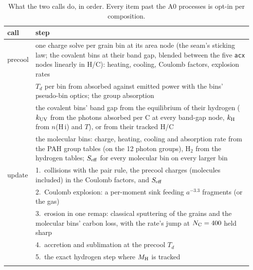\documentclass[11pt,a4paper]{article}
\newcommand{\NC}{N_{\rm C}}
\newcommand{\MH}{M_{\rm H}}
\begin{document}
\begin{table}[H]
\centering\small
\caption{What the two calls do, in order. Every item past the A0 processes is opt-in per composition.}\label{tab:a3c}
\begin{tabularx}{\textwidth}{@{}l L@{}}
\toprule
call & step \\
\midrule
precool & one charge solve per grain bin at its area node (the seam's sticking law; the covalent bins at their band gap,
  blended between the five \texttt{acx} nodes linearly in H/C): heating, cooling, Coulomb factors, explosion rates \\
\addlinespace[3pt]
& $T_d$ per bin from absorbed against emitted power with the bins' pseudo-bin optics; the group absorption \\
\addlinespace[3pt]
& the covalent bins' band gap from the equilibrium of their hydrogen ($k_{\rm UV}$ from the photons absorbed per C at
  every band-gap node, $k_{\rm H}$ from $n$(H\,{\sc i}) and $T$), or from their tracked H/C \\
\addlinespace[3pt]
& the molecular bins: charge, heating, cooling and absorption rate from the PAH group tables (on the 12 photon groups),
  H$_2$ from the hydrogen tables; $S_{\rm eff}$ for every molecular bin on every larger bin \\
\addlinespace[3pt]
\midrule
update & 1.\ collisions with the pair rule, the precool charges (molecules included) in the Coulomb factors, and
  $S_{\rm eff}$ \\
\addlinespace[3pt]
& 2.\ Coulomb explosion: a per-moment sink feeding $a^{-3.3}$ fragments (or the gas) \\
\addlinespace[3pt]
& 3.\ erosion in one remap: classical sputtering of the grains and the molecular bins' carbon loss, with the rate's
  jump at $\NC = 400$ held sharp \\
\addlinespace[3pt]
& 4.\ accretion and sublimation at the precool $T_d$ \\
\addlinespace[3pt]
& 5.\ the exact hydrogen step where $\MH$ is tracked \\
\addlinespace[3pt]
\bottomrule
\end{tabularx}
\end{table}
\end{document}
